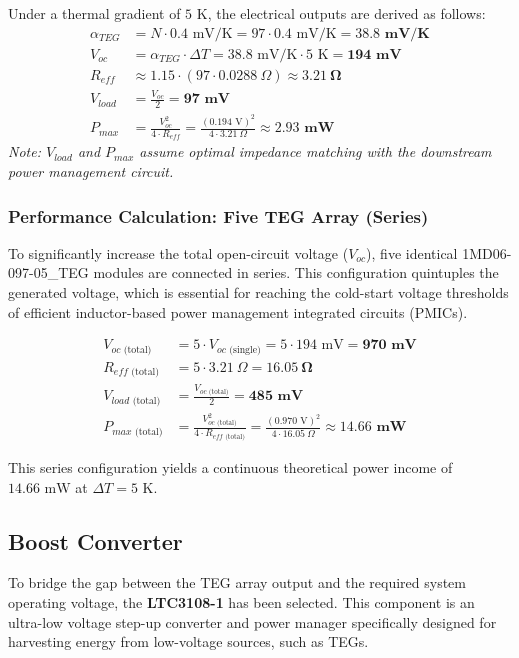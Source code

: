 \documentclass[paper=a4]{article}
\begin{document}
Under a thermal gradient of $5\text{ K}$, the electrical outputs are derived as follows:
\begin{align*}
    \alpha_{TEG} &= N \cdot 0.4\text{ mV/K} = 97 \cdot 0.4\text{ mV/K} = \mathbf{38.8\text{ mV/K}} \\
    V_{oc} &= \alpha_{TEG} \cdot \Delta T = 38.8\text{ mV/K} \cdot 5\text{ K} = \mathbf{194\text{ mV}} \\
    R_{eff} &\approx 1.15 \cdot (97 \cdot 0.0288\ \Omega) \approx \mathbf{3.21\ \Omega} \\
    V_{load} &= \frac{V_{oc}}{2} = \mathbf{97\text{ mV}} \\
    P_{max} &= \frac{V_{oc}^2}{4 \cdot R_{eff}} = \frac{(0.194\text{ V})^2}{4 \cdot 3.21\ \Omega} \approx \mathbf{2.93\text{ mW}}
\end{align*}
\textit{Note: $V_{load}$ and $P_{max}$ assume optimal impedance matching with the downstream power management circuit.}

\subsubsection*{Performance Calculation: Five TEG Array (Series)}
To significantly increase the total open-circuit voltage ($V_{oc}$), five identical 1MD06-097-05\_TEG modules are connected in series. This configuration quintuples the generated voltage, which is essential for reaching the cold-start voltage thresholds of efficient inductor-based power management integrated circuits (PMICs).

\begin{align*}
    V_{oc\text{ (total)}} &= 5 \cdot V_{oc\text{ (single)}} = 5 \cdot 194\text{ mV} = \mathbf{970\text{ mV}} \\
    R_{eff\text{ (total)}} &= 5 \cdot 3.21\ \Omega = \mathbf{16.05\ \Omega} \\
    V_{load\text{ (total)}} &= \frac{V_{oc\text{ (total)}}}{2} = \mathbf{485\text{ mV}} \\
    P_{max\text{ (total)}} &= \frac{V_{oc\text{ (total)}}^2}{4 \cdot R_{eff\text{ (total)}}} = \frac{(0.970\text{ V})^2}{4 \cdot 16.05\ \Omega} \approx \mathbf{14.66\text{ mW}}
\end{align*}

This series configuration yields a continuous theoretical power income of $14.66\text{ mW}$ at $\Delta T = 5\text{ K}$.

\subsection{Boost Converter}
To bridge the gap between the TEG array output and the required system operating voltage, the \textbf{LTC3108-1} has been selected. This component is an ultra-low voltage step-up converter and power manager specifically designed for harvesting energy from low-voltage sources, such as TEGs.
\end{document}
